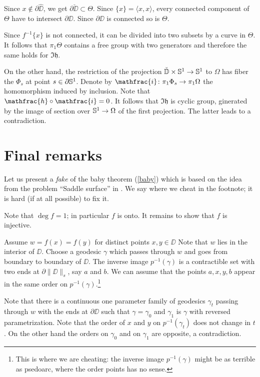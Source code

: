 \documentclass{article}
\begin{document}
Since $x\notin\partial \hat \DD$, we get $\partial\check \DD\subset \Theta$.
Since $\{x\}=\langle x,x\rangle$, every connected component of $\Theta$ have to intersect $\partial\DD$.
Since $\partial\DD$ is connected so is $\Theta$.

Since $f^{-1}\{x\}$ is not connected, it can be divided into two subsets by a curve in $\Theta$.
It follows that $\pi_1\Theta$ contains a free group with two generators and therefore 
the same holds for $\Im\mathfrak{h}$.

On the other hand, the restriction of the projection $\check{\mathbb{D}}\times\mathbb{S}^1\to \mathbb{S}^1$ to $\Omega$ has fiber the $\Phi_s$ at point $s\in\partial \mathbb{S}^1$.
Denote by $\mathfrac{i}\:\pi_1\Phi_s\to \pi_1\Omega$ the homomorphism induced by inclusion.
Note that $\mathfrac{h}\circ\mathfrac{i}=0$.
It follows that $\Im\mathfrak{h}$ is cyclic group, ginerated by the image of section over $\mathbb{S}^1\to \Omega$ of the first projection.
The latter leads to a contradiction.
\qeds

\section{Final remarks}

Let us present a \emph{fake} of the baby theorem (\ref{baby}) which is based on the idea from the problem ``Saddle surface'' in \cite{petrunin-orthodox}.
We say where we cheat in the footnote; 
it is hard (if at all possible) to fix it.

Note that  $\deg f=1$;
in particular $f$ is onto.
It remains to show that $f$ is injective.

Assume  $w=f(x)=f(y)$ for distinct points $x,y\in\DD$
Note that  $w$ lies in the interior of $\DD$.
Choose a geodesic $\gamma$ which passes through $w$ and goes 
from boundary to boundary of $\DD$.
The inverse image $p^{-1}(\gamma)$ is a contractible set with two ends at $\partial\|\DD\|_s$, say $a$ and $b$.
We can assume that the points $a,x,y,b$ appear in the same order on $p^{-1}(\gamma)$.\footnote{This is where we are cheating: the inverse image $p^{-1}(\gamma)$ might be as terrible as psedoarc, where the order points has no sense.}

Note that there is a continuous one parameter family of geodesics $\gamma_t$ passing through $w$ with the ends at $\partial \DD$
such that $\gamma=\gamma_0$ and $\gamma_1$ is $\gamma$ with reversed parametrization.
Note that the order of $x$ and $y$ on $p^{-1}(\gamma_t)$ does not change in $t$.
On the other hand the orders on $\gamma_0$ and on $\gamma_1$ are opposite, a contradiction.\qeds
\end{document}
